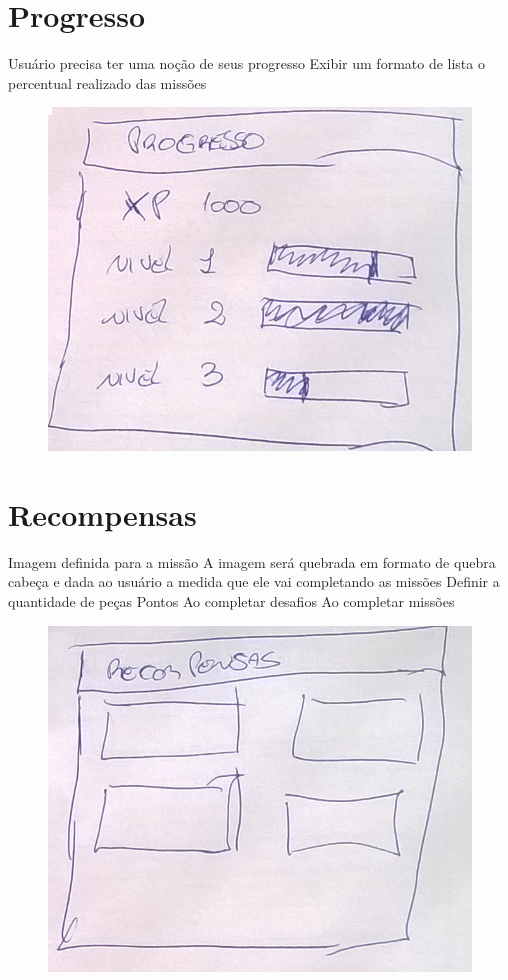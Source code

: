 \documentclass[
	12pt,				%
	oneside,			%
	a4paper,			%
	english,			%
	french,				%
	spanish,			%
	brazil,				%
	]{abntex2}
\begin{document}
\section{Progresso}

Usuário precisa ter uma noção de seus progresso
Exibir um formato de lista o percentual realizado das missões 

\begin{figure}[ht]
\centering
\includegraphics[width=1\textwidth]{imagens/proposta_progresso.png}
\end{figure}

\section{Recompensas}

Imagem definida para a missão
A imagem será quebrada em formato de quebra cabeça e dada ao usuário a medida que ele vai completando as missões
Definir a quantidade de peças
Pontos
Ao completar desafios
Ao completar missões

\begin{figure}[ht]
\centering
\includegraphics[width=1\textwidth]{imagens/proposta_recompensa.png}
\end{figure}
\end{document}
